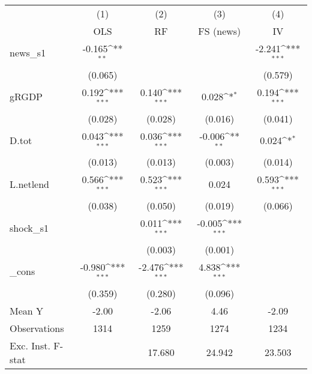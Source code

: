 {
\def\sym#1{\ifmmode^{#1}\else\(^{#1}\)\fi}
\begin{tabular}{l*{4}{c}}
\toprule
            &\multicolumn{1}{c}{(1)}&\multicolumn{1}{c}{(2)}&\multicolumn{1}{c}{(3)}&\multicolumn{1}{c}{(4)}\\
            &\multicolumn{1}{c}{OLS}&\multicolumn{1}{c}{RF}&\multicolumn{1}{c}{FS (news)}&\multicolumn{1}{c}{IV}\\
\midrule
news\_s1     &      -0.165\sym{**} &                     &                     &      -2.241\sym{***}\\
            &     (0.065)         &                     &                     &     (0.579)         \\
\addlinespace
gRGDP       &       0.192\sym{***}&       0.140\sym{***}&       0.028\sym{*}  &       0.194\sym{***}\\
            &     (0.028)         &     (0.028)         &     (0.016)         &     (0.041)         \\
\addlinespace
D.tot       &       0.043\sym{***}&       0.036\sym{***}&      -0.006\sym{**} &       0.024\sym{*}  \\
            &     (0.013)         &     (0.013)         &     (0.003)         &     (0.014)         \\
\addlinespace
L.netlend   &       0.566\sym{***}&       0.523\sym{***}&       0.024         &       0.593\sym{***}\\
            &     (0.038)         &     (0.050)         &     (0.019)         &     (0.066)         \\
\addlinespace
shock\_s1    &                     &       0.011\sym{***}&      -0.005\sym{***}&                     \\
            &                     &     (0.003)         &     (0.001)         &                     \\
\addlinespace
\_cons      &      -0.980\sym{***}&      -2.476\sym{***}&       4.838\sym{***}&                     \\
            &     (0.359)         &     (0.280)         &     (0.096)         &                     \\
\midrule
Mean Y      &       -2.00         &       -2.06         &        4.46         &       -2.09         \\
Observations&        1314         &        1259         &        1274         &        1234         \\
Exc. Inst. F-stat&                     &      17.680         &      24.942         &      23.503         \\
\bottomrule
\end{tabular}
}
